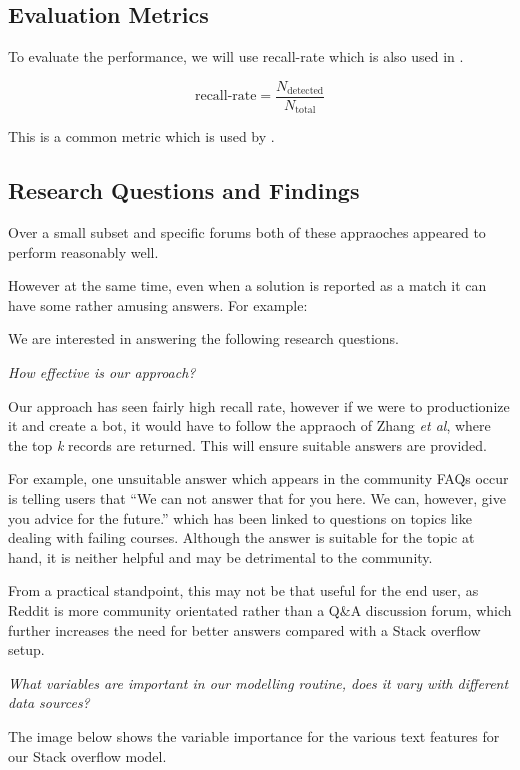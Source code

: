 \documentclass[journal]{IEEEtran}
\begin{document}
\subsection{Evaluation Metrics}

To evaluate the performance, we will use recall-rate which is also used in \cite{dupred}. 

$$
\text{recall-rate} = \frac{N_\text{detected}}{N_\text{total}}
$$

This is a common metric which is used by \cite{dupred}.

\subsection{Research Questions and Findings}

Over a small subset and specific forums both of these appraoches appeared to perform reasonably well. 

However at the same time, even when a solution is reported as a match it can have some rather amusing answers. For example:




We are interested in answering the following research questions.

\emph{How effective is our approach?}

Our approach has seen fairly high recall rate, however if we were to productionize it and create a bot, it would have to follow the appraoch of Zhang \emph{et al}\cite{dupred}, where the top \emph{k} records are returned. This will ensure suitable answers are provided. 

For example, one unsuitable answer which appears in the community FAQs occur is telling users that ``We can not answer that for you here. We can, however, give you advice for the future.'' which has been linked to questions on topics like dealing with failing courses. Although the answer is suitable for the topic at hand, it is neither helpful and may be detrimental to the community. 


From a practical standpoint, this may not be that useful for the end user, as Reddit is more community orientated rather than a Q\&A discussion forum, which further increases the need for better answers compared with a Stack overflow setup. 


\emph{What variables are important in our modelling routine, does it vary with different data sources?}

The image below shows the variable importance for the various text features for our Stack overflow model.
\end{document}
